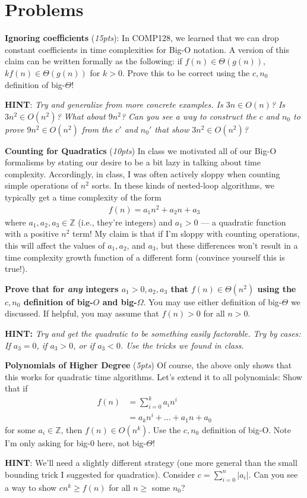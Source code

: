 \documentclass{exam}
\begin{document}
\section*{Problems} 
\begin{questions}
    \question \textbf{Ignoring coefficients} (\textit{15pts}):
    In COMP128, we learned that we can drop constant coefficients in time complexities for Big-O notation. A version of this claim can be written formally as the following: if $f(n) \in \Theta(g(n))$, $kf(n) \in \Theta(g(n))$ for $k > 0$. Prove this to be correct using the $c, n_0$ definition of big-$\Theta$!

    \textbf{HINT}: \textit{Try and generalize from more concrete examples. Is $3n \in O(n)$? Is $3n^2 \in O(n^2)$? What about $9n^2$? Can you see a way to construct the $c$ and $n_0$ to prove $9n^2 \in O(n^2)$ from the $c'$ and $n_0'$ that show $3n^2 \in O(n^2)$?} 

    \question \textbf{Counting for Quadratics} (\textit{10pts})
    In class we motivated all of our Big-O formalisms by stating our desire to be a bit lazy in talking about time complexity. Accordingly, in class, I was often actively sloppy when counting simple operations of $n^2$ sorts. In these kinds of nested-loop algorithms, we typically get a time complexity of the form
    \begin{align*}
        f(n) = a_1n^2 + a_2n + a_3
    \end{align*}
    where $a_1, a_2, a_3 \in \mathbb{Z}$ (i.e., they're integers) and $a_1 > 0$ --- a quadratic function with a positive $n^2$ term! My claim is that if I'm sloppy with counting operations, this will affect the values of $a_1, a_2$, and $a_3$, but these differences won't result in a time complexity growth function of a different form (convince yourself this is true!). 
    
    \textbf{Prove that for \textit{any} integers $a_1 > 0, a_2, a_3$ that $f(n) \in \Theta(n^2)$ using the $c, n_0$ definition of big-$O$ and big-$\Omega$}. You may use either definition of big-$\Theta$ we discussed. If helpful, you may assume that $f(n) > 0$ for all $n > 0$.

    \textbf{HINT:} \textit{Try and get the quadratic to be something easily factorable. Try by cases: If $a_3 = 0$, if $a_3 > 0$, or if $a_3 < 0$. Use the tricks we found in class.}


    \question \textbf{Polynomials of Higher Degree} (\textit{5pts})
    Of course, the above only shows that this works for quadratic time algorithms. Let's extend it to all polynomials: Show that if
    \begin{align*}
        f(n) &= \sum_{i=0}^k a_in^i \\
             &= a_kn^i + \dots + a_1n + a_0
    \end{align*}
    for some $a_i \in \mathbb{Z}$, then $f(n) \in O(n^k)$. Use the $c, n_0$ definition of big-O. Note I'm only asking for big-$0$ here, not big-$\Theta$!

    \textbf{HINT}: We'll need a slightly different strategy (one more general than the small bounding trick I suggested for quadratics). Consider $c = \sum_{i=0}^n |a_i|$. Can you see a way to show $cn^k \geq f(n)$ for all $n \geq$ some $n_0$?
\end{questions}
\end{document}
